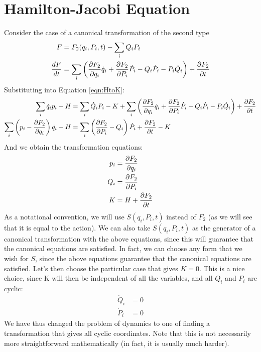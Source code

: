 \section{Hamilton-Jacobi Equation}
Consider the case of a canonical transformation of the second type
\begin{align}
F&=F_2(q_i,P_i,t)-\sum_iQ_iP_i\nonumber\\
\frac{dF}{dt}&=\sum_i\left(\frac{\partial F_2}{\partial q_i}\dot q_i+\frac{\partial F_2}{\partial P_i}\dot P_i- Q_i\dot P_i-P_i\dot Q_i\right)+\frac{\partial F_2}{\partial t}
\end{align}
Substituting into Equation \ref{eqn:HtoK}:
\begin{align}
\sum_i\dot q_ip_i-H&=\sum_i \dot Q_iP_i-K+\sum_i\left(\frac{\partial F_2}{\partial q_i}\dot q_i+\frac{\partial F_2}{\partial P_i}\dot P_i- Q_i\dot P_i-P_i\dot Q_i\right)+\frac{\partial F_2}{\partial t}\nonumber\\
\sum_i\left(p_i-\frac{\partial F_2}{\partial q_i}\right)\dot q_i -H&=\sum_i\left(\frac{\partial F_2}{\partial P_i}- Q_i \right)\dot P_i+\frac{\partial F_2}{\partial t} -K
\end{align}
And we obtain the transformation equations:
\begin{align}
p_i&=\frac{\partial F_2}{\partial q_i}\nonumber\\
Q_i&=\frac{\partial F_2}{\partial P_i}\nonumber\\
K&=H+\frac{\partial F_2}{\partial t}
\end{align}
As a notational convention, we will use $S(q_i,P_i,t)$ instead of $F_2$ (as we will see that it is equal to the action). We can also take $S(q_i,P_i,t)$ as the generator of a canonical transformation with the above equations, since this will guarantee that the canonical equations are satisfied. In fact, we can choose any form that we wish for $S$, since the above equations guarantee that the canonical equations are satisfied. Let's then choose the particular case that gives $K=0$. This is a nice choice, since K will then be independent of all the variables, and all $Q_i$ and $P_i$ are cyclic:
\begin{align}
\dot Q_i&=0\nonumber\\
\dot P_i&=0
\end{align}
We have thus changed the problem of dynamics to one of finding a transformation that gives all cyclic coordinates. Note that this is not necessarily more straightforward mathematically (in fact, it is usually much harder).

